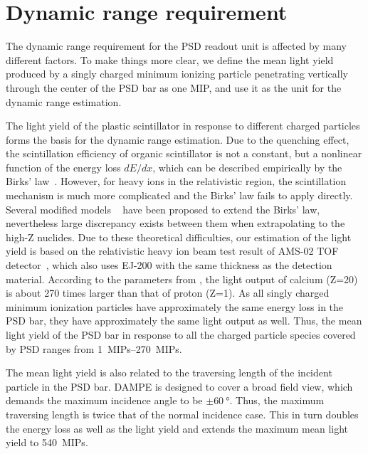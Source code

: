 \documentclass[preprint, times]{elsarticle}
\begin{document}
\section{Dynamic range requirement}
\label{sec:requirement}

The dynamic range requirement for the PSD readout unit is affected by many different factors.
To make things more clear, we define the mean light yield produced by a singly charged minimum ionizing particle penetrating vertically through the center of the PSD bar as one MIP, and use it as the unit for the dynamic range estimation.

The light yield of the plastic scintillator in response to different charged particles forms the basis for the dynamic range estimation.
Due to the quenching effect, the scintillation efficiency of organic scintillator is not a constant, but a nonlinear function of the energy loss $dE/dx$, which can be described empirically by the Birks' law~\cite{birks_theory_2013}.
 However, for heavy ions in the relativistic region, the scintillation mechanism is much more complicated and the Birks' law fails to apply directly. 
 Several modified models ~\cite{chou_nature_1952,tarle_cosmic_1979,menchaca-rocha_response_1999,matsufuji_response_1999} have been proposed to extend the Birks' law, nevertheless large discrepancy exists between them when extrapolating to the high-Z nuclides.
Due to these theoretical difficulties, our estimation of the light yield is based on the relativistic heavy ion beam test result of AMS-02 TOF detector~\cite{bindi2005performance,bindi_calibration_2014}, which also uses EJ-200 with the same thickness as the detection material.
According to the parameters from \cite{bindi2005performance}, the light output of calcium (Z=20) is about 270 times larger than that of proton (Z=1).
As all singly charged minimum ionization particles have approximately the same energy loss in the PSD bar, they have approximately the same light output as well.
Thus, the mean light yield of the PSD bar in response to all the charged particle species covered by PSD ranges from \SIrange{1}{270}{MIPs}.

The mean light yield is also related to the traversing length of the incident particle in the PSD bar.
DAMPE is designed to cover a broad field view, which demands the maximum incidence angle to be $\pm\SI{60}{\degree}$.
Thus, the maximum traversing length is twice that of the normal incidence case.
This in turn doubles the energy loss as well as the light yield and extends the maximum mean light yield to \SI{540}{MIPs}.
\end{document}
